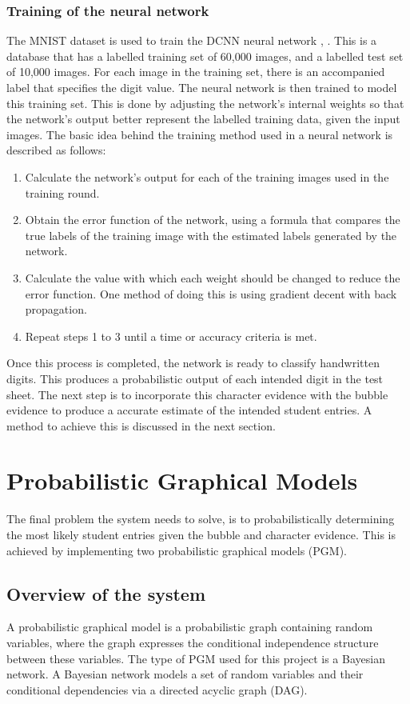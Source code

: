 \subsubsection{Training of the neural network}
\label{sec:trainNN}
The MNIST dataset is used to train the DCNN neural network , \citet{mnist}. This is a database that has a labelled training set of 60,000 images, and a labelled test set of 10,000 images. For each image in the training set, there is an accompanied label that specifies the digit value. The neural network is then trained to model this training set. This is done by adjusting the network's internal weights so that the network's output better represent the labelled training data, given the input images. The basic idea behind the training method used in a neural network is described as follows:

\begin{enumerate}
\item Calculate the network's output for each of the training images used in the training round.
\item Obtain the error function of the network, using a formula that compares the true labels of the training image with the estimated labels generated by the network.
\item Calculate the value with which each weight should be changed to reduce the error function. One method of doing this is using gradient decent with back propagation.
\item Repeat steps 1 to 3 until a time or accuracy criteria is met.
\end{enumerate}

Once this process is completed, the network is ready to classify handwritten digits. This produces a probabilistic output of each intended digit in the test sheet. The next step is to incorporate this character evidence with the bubble evidence to produce a accurate estimate of the intended student entries. A method to achieve this is discussed in the next section.

\section{Probabilistic Graphical Models}
\label{sec:PGM}
The final problem the system needs to solve, is to probabilistically determining the most likely student entries given the bubble and character evidence. This is achieved by implementing two probabilistic graphical models (PGM).

\subsection{Overview of the system}
A probabilistic graphical model is a probabilistic graph containing random variables, where the graph expresses the conditional independence structure between these variables. The type of PGM used for this project is a Bayesian network. A Bayesian network models a set of random variables and their conditional dependencies via a directed acyclic graph (DAG).

